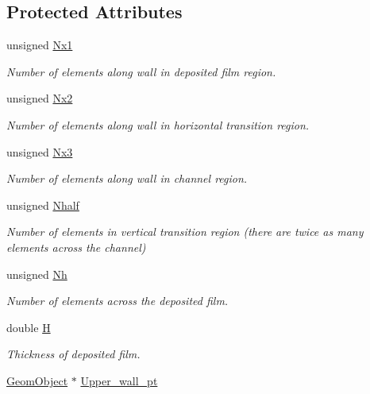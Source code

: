 \subsection*{Protected Attributes}
\begin{DoxyCompactItemize}
\item 
unsigned \hyperlink{classoomph_1_1BrethertonSpineMesh_af6ef10fb80559c3ad27a50116da60dcc}{Nx1}
\begin{DoxyCompactList}\small\item\em Number of elements along wall in deposited film region. \end{DoxyCompactList}\item 
unsigned \hyperlink{classoomph_1_1BrethertonSpineMesh_a237b4f516eb3f74e42e190f2a23f93c3}{Nx2}
\begin{DoxyCompactList}\small\item\em Number of elements along wall in horizontal transition region. \end{DoxyCompactList}\item 
unsigned \hyperlink{classoomph_1_1BrethertonSpineMesh_a26c57f832b7cdc495087cef7b54c98fd}{Nx3}
\begin{DoxyCompactList}\small\item\em Number of elements along wall in channel region. \end{DoxyCompactList}\item 
unsigned \hyperlink{classoomph_1_1BrethertonSpineMesh_a1e58d18dd2231c785008efa07260e8da}{Nhalf}
\begin{DoxyCompactList}\small\item\em Number of elements in vertical transition region (there are twice as many elements across the channel) \end{DoxyCompactList}\item 
unsigned \hyperlink{classoomph_1_1BrethertonSpineMesh_a4ba20dfa61b6c342f2defbc0cdb47851}{Nh}
\begin{DoxyCompactList}\small\item\em Number of elements across the deposited film. \end{DoxyCompactList}\item 
double \hyperlink{classoomph_1_1BrethertonSpineMesh_a3d711e1bc9d751ab14662f6839a900e3}{H}
\begin{DoxyCompactList}\small\item\em Thickness of deposited film. \end{DoxyCompactList}\item 
\hyperlink{classoomph_1_1GeomObject}{Geom\+Object} $\ast$ \hyperlink{classoomph_1_1BrethertonSpineMesh_a1f97e78a12000afcc1bd754102b5b51a}{Upper\+\_\+wall\+\_\+pt}

\end{DoxyCompactItemize}
